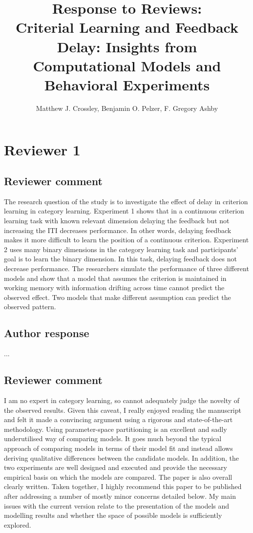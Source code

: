 \documentclass[12pt]{article}
\title{Response to Reviews: \\ \vspace{1cm}
    Criterial Learning and Feedback Delay: Insights from
Computational Models and Behavioral Experiments}
\author{
    Matthew J. Crossley, 
    Benjamin O. Pelzer,
    F. Gregory Ashby
}
\date{}
\begin{document}
\maketitle 

\section{Reviewer 1}

\subsection{Reviewer comment}
The research question of the study is to investigate the
effect of delay in criterion learning in category learning.
Experiment 1 shows that in a continuous criterion learning
task with known relevant dimension delaying the feedback but
not increasing the ITI decreases performance. In other
words, delaying feedback makes it more difficult to learn
the position of a continuous criterion. Experiment 2 uses
many binary dimensions in the category learning task and
participants' goal is to learn the binary dimension. In this
task, delaying feedback does not decrease performance. The
researchers simulate the performance of three different
models and show that a model that assumes the criterion is
maintained in working memory with information drifting
across time cannot predict the observed effect. Two models
that make different assumption can predict the observed
pattern.

\subsection{Author response}
...

\subsection{Reviewer comment}
I am no expert in category learning, so cannot adequately
judge the novelty of the observed results. Given this
caveat, I really enjoyed reading the manuscript and felt it
made a convincing argument using a rigorous and
state-of-the-art methodology. Using parameter-space
partitioning is an excellent and sadly underutilised way of
comparing models. It goes much beyond the typical approach
of comparing models in terms of their model fit and instead
allows deriving qualitative differences between the
candidate models. In addition, the two experiments are well
designed and executed and provide the necessary empirical
basis on which the models are compared. The paper is also
overall clearly written. Taken together, I highly recommend
this paper to be published after addressing a number of
mostly minor concerns detailed below. My main issues with
the current version relate to the presentation of the models
and modelling results and whether the space of possible
models is sufficiently explored.
\end{document}
